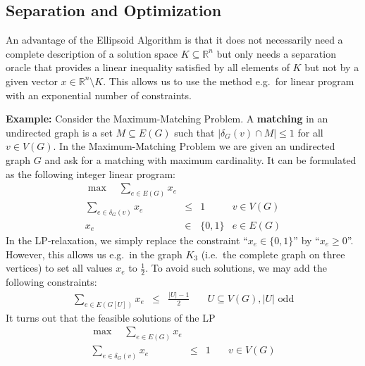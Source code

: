 \documentclass[12pt, showidx, twoside]{article}
\def\R{\mathbb{R}}
\def\hi{\bf}
\begin{document}
{{{\iffalse
\subsection{Separation and Optimization}

An advantage of the {\sc Ellipsoid Algorithm} is that it does not necessarily
need a complete description of a solution space $K \subseteq \R^n$ but only
needs a separation oracle that provides a linear inequality satisfied by
all elements of $K$ but not by a given vector $x \in \R^n \setminus K$.
This allows us to use the method e.g.\ for linear program with an exponential number
of constraints.

{\bf Example:} Consider the {\sc Maximum-Matching Problem}. 
A {\hi matching} {} in an undirected graph is a set $M \subseteq E(G)$
such that $|\delta_G(v) \cap M| \leq 1$ for all $v \in V(G)$.
In the {\sc Maximum-Matching Problem} we are given an undirected graph $G$ and ask
for a matching with maximum cardinality. It can be formulated as the following
integer linear program:
\begin{equation*}
\begin{array}{rcll}
 \max \quad \sum_{e \in E(G)} x_e & & & \\
    \sum_{e \in \delta_G(v)} x_e & \leq & 1 & v \in V(G) \\
    x_e & \in & \{0,1\} & e \in E(G)
\end{array}
\end{equation*}
In the LP-relaxation, we simply replace the constraint ``$x_e \in \{0,1\}$''
by ``$x_e \geq 0$''. However, this allows us e.g.\ in the graph $K_3$ (i.e.\ the 
complete graph on three vertices) to set all values $x_e$ to $\frac{1}{2}$.
To avoid such solutions, we may add the following constraints:
\begin{equation*}
\begin{array}{rcll}
   \sum_{e \in E(G[U])} x_e & \leq & \frac{|U|-1}{2} & \quad U\subseteq V(G), |U| \text{ odd}
\end{array}
\end{equation*}
It turns out that the feasible solutions of the LP
\begin{equation*}
\begin{array}{rcll}
 \max \quad \sum_{e \in E(G)} x_e & & & \\
    \sum_{e \in \delta_G(v)} x_e & \leq & 1 & \quad v \in V(G) \\

\end{array}
\end{equation*}}}}
\end{document}
